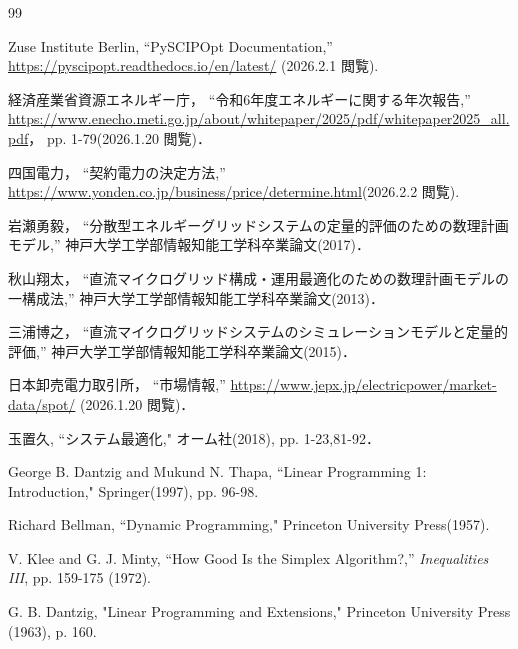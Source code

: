 
\begin{thebibliography}{99}

Zuse Institute Berlin, “PySCIPOpt Documentation,” \url{https://pyscipopt.readthedocs.io/en/latest/} (2026.2.1 閲覧).

経済産業省資源エネルギー庁，
``令和6年度エネルギーに関する年次報告,''
\url{https://www.enecho.meti.go.jp/about/whitepaper/2025/pdf/whitepaper2025_all.pdf}，
pp. 1-79(2026.1.20 閲覧)．

四国電力，
``契約電力の決定方法,''
\url{https://www.yonden.co.jp/business/price/determine.html}(2026.2.2 閲覧).

岩瀬勇毅，
``分散型エネルギーグリッドシステムの定量的評価のための数理計画モデル,''
神戸大学工学部情報知能工学科卒業論文(2017)．

秋山翔太，
``直流マイクログリッド構成・運用最適化のための数理計画モデルの一構成法,''
神戸大学工学部情報知能工学科卒業論文(2013)．

三浦博之，
``直流マイクログリッドシステムのシミュレーションモデルと定量的評価,''
神戸大学工学部情報知能工学科卒業論文(2015)．

日本卸売電力取引所，
``市場情報,''
\url{https://www.jepx.jp/electricpower/market-data/spot/}
(2026.1.20 閲覧)．

玉置久, ``システム最適化," オーム社(2018), pp. 1-23,81-92．

George B. Dantzig and Mukund N. Thapa, ``Linear Programming 1: Introduction," Springer(1997), pp. 96-98.

Richard Bellman, ``Dynamic Programming," Princeton University Press(1957).

V. Klee and G. J. Minty, “How Good Is the Simplex Algorithm?,” \textit{Inequalities III}, pp. 159-175 (1972).

G. B. Dantzig, "Linear Programming and Extensions," Princeton University Press (1963), p. 160.

\end{thebibliography}

\newpage